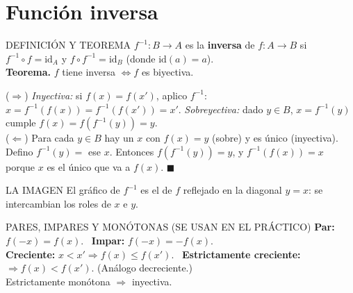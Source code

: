 \section{Función inversa}
\apuntes
\begin{sello}{DEFINICIÓN Y TEOREMA}
$f^{-1}:B\to A$ es la \textbf{inversa} de $f:A\to B$ si $f^{-1}\circ f=\mathrm{id}_A$ y $f\circ f^{-1}=\mathrm{id}_B$ (donde $\mathrm{id}(a)=a$).\\[3pt]
\textbf{Teorema.} $f$ tiene inversa $\iff f$ es biyectiva.
\end{sello}
\agregado
\begin{demo}
($\Rightarrow$) \emph{Inyectiva:} si $f(x)=f(x')$, aplico $f^{-1}$: $x=f^{-1}(f(x))=f^{-1}(f(x'))=x'$. \emph{Sobreyectiva:} dado $y\in B$, $x=f^{-1}(y)$ cumple $f(x)=f(f^{-1}(y))=y$.\\[3pt]
($\Leftarrow$) Para cada $y\in B$ hay un $x$ con $f(x)=y$ (sobre) y es único (inyectiva). Defino $f^{-1}(y)=$ ese $x$. Entonces $f(f^{-1}(y))=y$, y $f^{-1}(f(x))=x$ porque $x$ es el único que va a $f(x)$. $\blacksquare$
\end{demo}
\begin{tip}{LA IMAGEN}
El gráfico de $f^{-1}$ es el de $f$ reflejado en la diagonal $y=x$: se intercambian los roles de $x$ e $y$.
\end{tip}

\agregado
\begin{sello}{PARES, IMPARES Y MONÓTONAS (SE USAN EN EL PRÁCTICO)}
\textbf{Par:} $f(-x)=f(x)$. \ \textbf{Impar:} $f(-x)=-f(x)$.\\[2pt]
\textbf{Creciente:} $x<x'\Rightarrow f(x)\le f(x')$. \ \textbf{Estrictamente creciente:} $\Rightarrow f(x)<f(x')$. (Análogo decreciente.)\\[2pt]
Estrictamente monótona $\Rightarrow$ inyectiva.
\end{sello}
